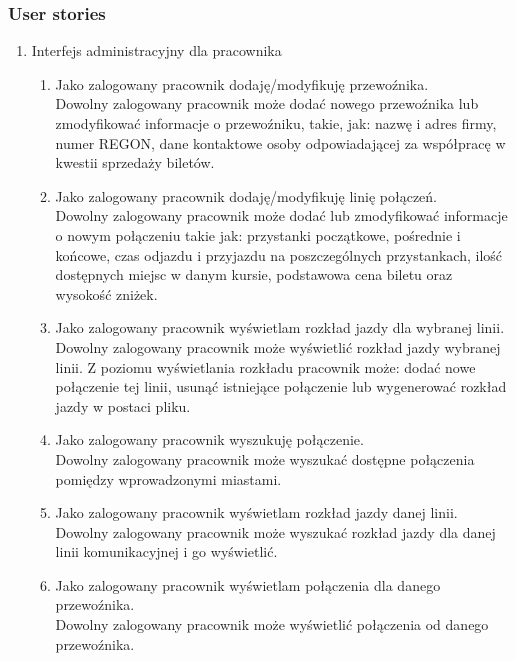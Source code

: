\documentclass[10pt,a4paper]{article}
\begin{document}
\subsubsection*{User stories}
\begin{enumerate}
	\bfseries
	\item Interfejs administracyjny dla pracownika
	\begin{enumerate}[label*=\arabic*.]
		\mdseries
		\item Jako zalogowany pracownik dodaję/modyfikuję przewoźnika. \\
			Dowolny zalogowany pracownik może dodać nowego przewoźnika lub zmodyfikować informacje o przewoźniku, takie, jak: nazwę i adres firmy, numer REGON, dane kontaktowe osoby odpowiadającej za współpracę w kwestii sprzedaży biletów.
		\item Jako zalogowany pracownik dodaję/modyfikuję linię połączeń. \\
			Dowolny zalogowany pracownik może dodać lub zmodyfikować informacje o nowym połączeniu takie jak: przystanki początkowe, pośrednie i końcowe, czas odjazdu i przyjazdu na poszczególnych przystankach, ilość dostępnych miejsc w danym kursie, podstawowa cena biletu oraz wysokość zniżek.
		\item Jako zalogowany pracownik wyświetlam rozkład jazdy dla wybranej linii. \\
		Dowolny zalogowany pracownik może wyświetlić rozkład jazdy wybranej linii. Z poziomu wyświetlania rozkładu pracownik może: dodać nowe połączenie tej linii, usunąć istniejące połączenie lub wygenerować rozkład jazdy w postaci pliku.
		\item Jako zalogowany pracownik wyszukuję połączenie. \\
		    Dowolny zalogowany pracownik może wyszukać dostępne połączenia pomiędzy
		    wprowadzonymi miastami.
	 	\item Jako zalogowany pracownik wyświetlam rozkład jazdy danej linii. \\
		    Dowolny zalogowany pracownik może wyszukać rozkład jazdy dla danej linii
		    komunikacyjnej i go wyświetlić.
	    	\item Jako zalogowany pracownik wyświetlam połączenia dla danego przewoźnika. \\
		    Dowolny zalogowany pracownik może wyświetlić połączenia od danego przewoźnika.
	\end{enumerate}
\end{enumerate}
\end{document}
